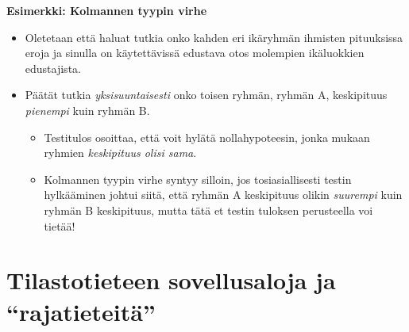 \documentclass[
]{book}
\providecommand{\tightlist}{%
  \setlength{\itemsep}{0pt}\setlength{\parskip}{0pt}}
\begin{document}
\newpage

\begin{eblock}{}

\textbf{Esimerkki: Kolmannen tyypin virhe}

\begin{itemize}
\tightlist
\item
  Oletetaan että haluat tutkia onko kahden eri ikäryhmän ihmisten pituuksissa eroja ja sinulla on käytettävissä edustava otos molempien ikäluokkien edustajista.
\item
  Päätät tutkia \emph{yksisuuntaisesti} onko toisen ryhmän, ryhmän A, keskipituus \emph{pienempi} kuin ryhmän B.

  \begin{itemize}
  \tightlist
  \item
    Testitulos osoittaa, että voit hylätä nollahypoteesin, jonka mukaan ryhmien \emph{keskipituus olisi sama}.
  \item
    Kolmannen tyypin virhe syntyy silloin, jos tosiasiallisesti testin hylkääminen johtui siitä, että ryhmän A keskipituus olikin \emph{suurempi} kuin ryhmän B keskipituus, mutta tätä et testin tuloksen perusteella voi tietää!\\
  \end{itemize}
\end{itemize}

\end{eblock}

\hypertarget{alaluku36}{%
\section{Tilastotieteen sovellusaloja ja ``rajatieteitä''}\label{alaluku36}}
\end{document}
